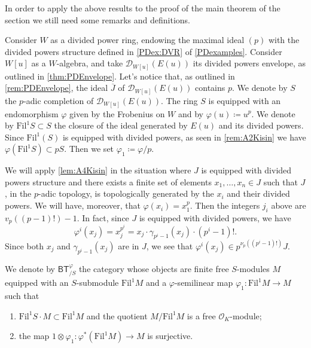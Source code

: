 \noindent
In order to apply the above results to the proof of the main theorem of the section
we still need some remarks and definitions.


\begin{ntt}[]
	Consider $W$ as a divided power ring, endowing the maximal ideal $(p)$
	with the divided powers structure defined in \cref{PDex:DVR} of \cref{PDexamples}.
	Consider $W[u]$ as a $W$-algebra, and take $\mathcal{D}_{W[u]}(E(u))$
	its divided powers envelope, as outlined in \cref{thm:PDEnvelope}.
	Let's notice that, as outlined in \cref{rem:PDEnvelope},
	the ideal $\overline{J}$ of $\mathcal{D}_{W[u]}(E(u))$ contains $p$.
	We denote by $S$ the $p$-adic completion of $\mathcal{D}_{W[u]}(E(u))$.
	The ring $S$ is equipped with an endomorphism $\varphi$ given by the Frobenius
	on $W$ and by $\varphi(u) \coloneqq u^p$.
	We denote by $\mathrm{Fil}^1 S \subset S$ the closure of the ideal
	generated by $E(u)$ and its divided powers.
	Since $\mathrm{Fil}^1(S)$ is equipped with divided powers, 
	as seen in \cref{rem:A2Kisin} we have $\varphi( \mathrm{Fil}^1 S) \subset p S$.
	Then we set $\varphi_1 \coloneqq \varphi/p$.
\end{ntt}


\begin{rem}[]\label{rem:j_iTheoremA6}
	We will apply \cref{lem:A4Kisin} in the situation where $J$ is equipped
	with divided powers structure and there exists a finite set of 
	elements $x_1, \ldots, x_n \in J$ such that $J$, in the $p$-adic topology, 
	is topologically generated by the $x_i$ and their divided powers.
	We will have, moreover, that $\varphi(x_i) = x_1^p$.
	Then the integers $j_i$ above are $v_p \left( (p-1)! \right) - 1$.
	In fact, since $J$ is equipped with divided powers, we have
	\begin{equation*}
		\varphi^i(x_j) =
		x_j^{p^i} =
		x_j \cdot \gamma_{p^i-1}(x_j) \cdot (p^i-1)!
	.\end{equation*}
	Since both $x_j$ and $\gamma_{p^i-1}(x_j)$ are in $J$,
	we see that $\varphi^i(x_j) \in p^{\nu_p((p^i-1)!)}J$.
\end{rem}


\begin{defn}[]
	We denote by $\mathsf{BT}^{\varphi}_{/S}$ the category
	whose objects are finite free $S$-modules $M$
	equipped with an $S$-submodule $\mathrm{Fil}^1 M$
	and a $\varphi$-semilinear map $\varphi_1\colon  \mathrm{Fil}^1 M \to M$
	such that
\begin{enumerate}
	\item $\mathrm{Fil}^1 S \cdot M \subset \mathrm{Fil}^1 M$
		and the quotient $M/\mathrm{Fil}^1 M$ is a free $\mathcal{O}_{ K }$-module;
	\item the map $1 \otimes \varphi_1\colon 
		\varphi^* \left( \mathrm{Fil}^1 M \right) \to M$
		is surjective.
\end{enumerate}
\end{defn}


